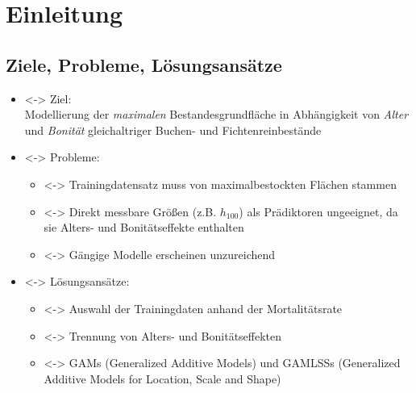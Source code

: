 \section{Einleitung}
\subsection{Ziele, Probleme, Lösungsansätze}
\begin{frame}[c]

  \begin{itemize}
  \item<\thefirstElement-> Ziel: \\
    Modellierung der \emph{maximalen} Bestandesgrundfläche in Abhängigkeit von \emph{Alter} und \emph{Bonität} gleichaltriger Buchen- und Fichtenreinbestände
  \item<\thesecondElement-> Probleme:
    \begin{itemize}
    \item<\thesecondElement-> Trainingdatensatz muss von maximalbestockten Flächen stammen
    \item<\thesecondElement-> Direkt messbare Größen (z.B. \(h_{100}\)) als Prädiktoren ungeeignet, da sie Alters- und Bonitätseffekte enthalten
    \item<\thesecondElement-> Gängige Modelle erscheinen unzureichend
    \end{itemize}
  \end{itemize}
  \begin{itemize}
  \item<\thethirdElement-> Lösungsansätze:
    \begin{itemize}
    \item<\thethirdElement-> Auswahl der Trainingdaten anhand der Mortalitätsrate
    \item<\thethirdElement-> Trennung von Alters- und Bonitätseffekten
    \item<\thethirdElement-> GAMs (Generalized Additive Models) und GAMLSSs (Generalized Additive Models for Location, Scale and Shape)
    \end{itemize}
  \end{itemize}
\end{frame}

